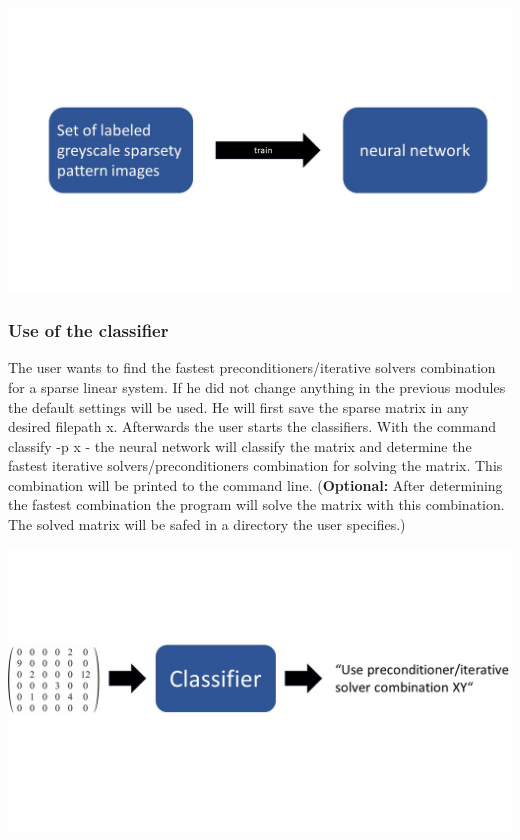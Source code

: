 \documentclass[parskip=full]{scrartcl}
\begin{document}
\begin{center}
\includegraphics[width=\textwidth]{trainingModule}
\end{center}

\subsubsection{Use of the classifier}

The user wants to find the fastest \glspl{preconditioner}/\glspl{iterative solver} combination for a sparse linear system. If he did not change anything in the previous modules the default settings will be used. He will first save the sparse matrix in any desired filepath x. Afterwards the user starts the \glspl{classifier}.
With the command classify  -p x - the neural network will classify the matrix and determine the fastest \glspl{iterative solver}/\glspl{preconditioner} combination for solving the matrix. This combination will be printed to the command line. (\textbf{Optional:} After determining the fastest combination the program will solve the matrix with this combination. The solved matrix will be safed in a directory the user specifies.)
\begin{center}
\includegraphics[width=\textwidth]{classifier}
\end{center}
\end{document}
